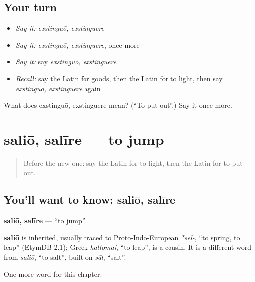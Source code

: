 \subsection*{Your turn}
\begin{itemize}
\raggedright
  \item \emph{Say it:} \emph{exstinguō, exstinguere}
  \item \emph{Say it:} \emph{exstinguō, exstinguere}, once more
  \item \emph{Say it:} say \emph{exstinguō, exstinguere}
  \item \emph{Recall:} say the Latin for goods, then the Latin for to light, then say \emph{exstinguō, exstinguere} again
\end{itemize}

\begin{tcolorbox}[breakable,colback=teal!4,colframe=teal!35!black,title={Before you move on}]
What does exstinguō, exstinguere mean? (\textquotedblleft{}To put out\textquotedblright{}.) Say it once more.
\end{tcolorbox}
\section[saliō, salīre]{saliō, salīre — to jump}

\label{lesson:LA-C165-salio}



\begin{quote}
Before the new one: say the Latin for to light, then the Latin for to put out.
\end{quote}

\subsection*{You'll want to know: saliō, salīre}
\textbf{saliō, salīre} — \textquotedblleft{}to jump\textquotedblright{}.

\begin{cousinweb}
\textbf{saliō} is inherited, usually traced to Proto-Indo-European \emph{*sel-}, \textquotedblleft{}to spring, to leap\textquotedblright{} (EtymDB 2.1); Greek \emph{hallomai}, \textquotedblleft{}to leap\textquotedblright{}, is a cousin. It is a different word from \emph{saliō}, \textquotedblleft{}to salt\textquotedblright{}, built on \emph{sāl}, \textquotedblleft{}salt\textquotedblright{}.
\end{cousinweb}

\begin{grammarlens}[title={What you've built}]
One more word for this chapter.
\end{grammarlens}


